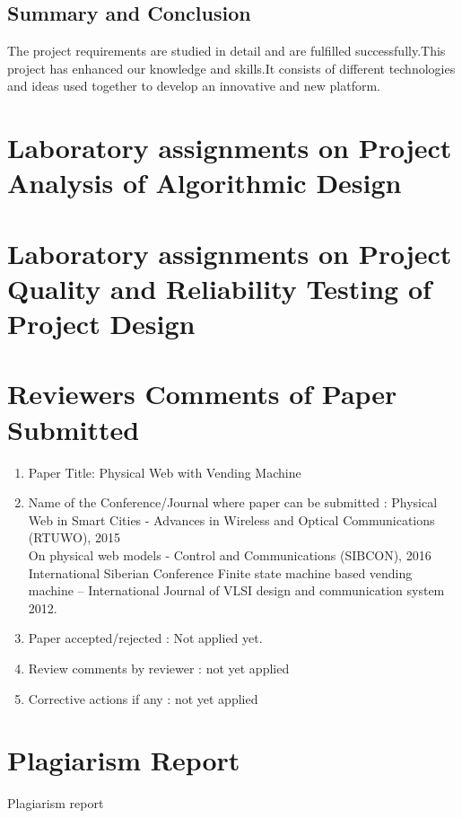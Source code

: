 \documentclass[oneside,a4paper,12pt]{report}
\begin{document}
\begin{appendices}
\newpage
\section{Summary and Conclusion}
The project requirements are studied in detail and are fulfilled successfully.This project has enhanced our knowledge and skills.It consists of different technologies and ideas used together to develop an innovative and new platform.  

\chapter{Laboratory assignments on Project Analysis of Algorithmic Design}




\chapter{Laboratory assignments on Project Quality and Reliability Testing of Project Design}

\chapter{Reviewers Comments of Paper Submitted}

\begin{enumerate}
\item Paper Title: Physical Web with Vending Machine

\item Name of the Conference/Journal where paper can be  submitted :
 Physical Web in Smart Cities - Advances in Wireless and Optical Communications (RTUWO), 2015\\
 On physical web models - Control and Communications (SIBCON), 2016 \\
International Siberian Conference Finite state machine based vending machine – International Journal of VLSI design and communication system 2012.\\


\item Paper accepted/rejected : Not applied yet. 
\item Review comments by reviewer : not yet applied 
\item Corrective actions if any :   not yet applied 

\end{enumerate}

\chapter{Plagiarism Report}
Plagiarism report


\end{appendices}
\end{document}
